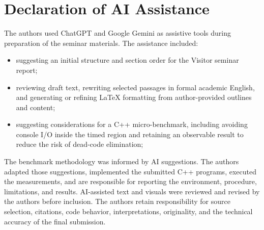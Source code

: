 \section{Declaration of AI Assistance}
\label{appendix:ai_assistance}

The authors used ChatGPT and Google Gemini as assistive tools during preparation of the seminar materials. The assistance included:

\begin{itemize}
    \item suggesting an initial structure and section order for the Visitor seminar report;
    \item reviewing draft text, rewriting selected passages in formal academic English, and generating or refining LaTeX formatting from author-provided outlines and content;
    \item suggesting considerations for a C++ micro-benchmark, including avoiding console I/O inside the timed region and retaining an observable result to reduce the risk of dead-code elimination;
\end{itemize}

The benchmark methodology was informed by AI suggestions. The authors adapted those suggestions, implemented the submitted C++ programs, executed the measurements, and are responsible for reporting the environment, procedure, limitations, and results. AI-assisted text and visuals were reviewed and revised by the authors before inclusion. The authors retain responsibility for source selection, citations, code behavior, interpretations, originality, and the technical accuracy of the final submission.
